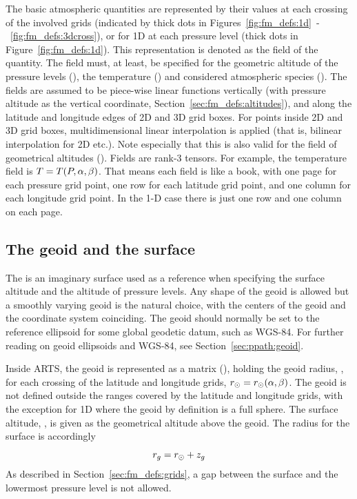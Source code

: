 The basic atmospheric quantities are represented by their values at
each crossing of the involved grids (indicated by thick dots in
Figures~\ref{fig:fm_defs:1d}~-~\ref{fig:fm_defs:3dcross}), or for 1D
at each pressure level (thick dots in Figure~\ref{fig:fm_defs:1d}).
This representation is denoted as the field
of the quantity. The field must, at least, be specified for the
geometric altitude of the pressure levels (), the
temperature () and considered atmospheric species
().  The fields are assumed to be piece-wise
linear functions vertically (with pressure altitude as the vertical
coordinate, Section~\ref{sec:fm_defs:altitudes}), and along the
latitude and longitude edges of 2D and 3D grid boxes. For points
inside 2D and 3D grid boxes, multidimensional linear interpolation is
applied (that is, bilinear interpolation for 2D etc.). Note especially
that this is also valid for the field of geometrical altitudes
(). Fields are rank-3 tensors. For example, the
temperature field is $T=T(P,\alpha,\beta)$. That means each field is
like a book, with one page for each pressure grid point, one row for
each latitude grid point, and one column for each longitude grid
point. In the 1-D case there is just one row and one column on each
page.



\subsection{The geoid and the surface}
\label{sec:fm_defs:geoid}

The  is an imaginary surface used as a
reference when specifying the surface altitude and the altitude
of pressure levels. Any shape of the geoid is allowed but a smoothly
varying geoid is the natural choice, with the centers of the geoid and
the coordinate system coinciding. The geoid should normally be set to
the reference ellipsoid for some global geodetic datum, such as
WGS-84. For further reading on geoid ellipsoids and WGS-84, see
Section~\ref{sec:ppath:geoid}.

Inside ARTS, the geoid is represented as a matrix
(), holding the geoid radius, \aRds{\odot}, for
each crossing of the latitude and longitude grids,
$r_{\odot}=r_{\odot}(\alpha,\beta)$. The geoid is not defined
outside the ranges covered by the latitude and longitude grids, with
the exception for 1D where the geoid by definition is a full sphere.
The surface altitude, , is given as the geometrical altitude
above the geoid. The radius for the surface is accordingly
\begin{equation}
  r_{g} = r_{\odot} + z_{g}
 \label{eq:fm_defs:zsurface}
\end{equation}
As described in
Section~\ref{sec:fm_defs:grids}, a gap between the surface and the 
lowermost pressure level is not allowed.

